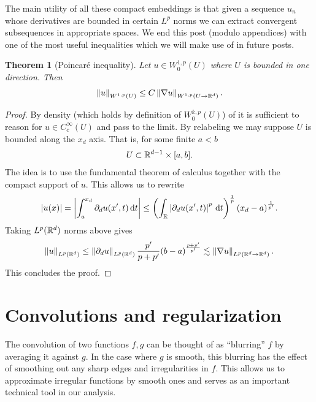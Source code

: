 \documentclass[12pt]{article}
\newtheorem{theorem}{Theorem}
\theoremstyle{remark}
\newcommand{\qt}[1]{\left(#1\right)}
\renewcommand{\norm}[1]{\left\lVert #1 \right\rVert}\renewcommand{\abs}[1]{\left| #1 \right|}
\renewcommand{\d}{\,\mathrm{d}}
\begin{document}
The main utility of all these compact embeddings is that given a sequence $u_n$ whose derivatives are bounded in certain  $L^p$ norms we can extract convergent subsequences in appropriate spaces. We end this post (modulo appendices) with one of the most useful inequalities which we will make use of in future posts.
\begin{theorem}[Poincaré inequality] Let $u \in W^{1,p}_0(U)$ where $U$ is bounded in one direction. Then
	\begin{align*}
		\norm{u}_{W^{1,p}(U)}\leq C\norm{\nabla u}_{W^{1,p}(U \to \R^d)}.
	\end{align*}
\end{theorem}
\begin{proof}
	By density (which holds by definition of $W^{k,p}_0(U)$) of it is sufficient to reason for $u \in C_c^\infty(U)$ and pass to the limit. By relabeling we may suppose $U$ is bounded along the $x_d$ axis. That is, for some finite $a<b$
	\begin{align*}
		U \subset \mathbb{R}^{d-1} \times [a,b].
	\end{align*}
	The idea is to use the fundamental theorem of calculus together with the compact support of $u$. This allows us to rewrite
	\begin{align*}
		\abs{u(x)}= \abs{\int_{a}^{x_d} \partial_d u(x',t) \d t} \leq \qt{\int_{\R}\abs{\partial _d u(x',t)}^p \d t}^\frac{1}{p}(x_d-a)^{\frac{1}{p'}}  .
	\end{align*}
	Taking $L^p(\mathbb{R}^d)$ norms above gives
	\begin{align*}
		\norm{u}_{L^p(\R^d)}\leq \norm{\partial _du}_{L^p(\R^d)}\frac{p'}{p+p'}(b-a)^{\frac{p+p'}{p'}} \lesssim  \norm{\nabla u}_{L^p(\R^d \to \R^d)} .
	\end{align*}
	This concludes the proof.    \end{proof}


\appendix
\section{Convolutions and regularization}
The convolution of two functions $f,g$ can be thought of as ``blurring''  $f$ by averaging it against $g$. In the case where  $g$ is smooth, this blurring has the effect of smoothing out any sharp edges and irregularities in  $f$. This allows us to approximate irregular functions by smooth ones and serves as an important technical tool in our analysis.
\end{document}
